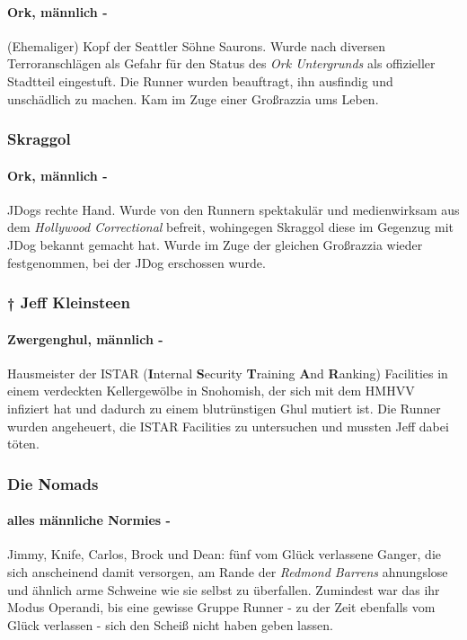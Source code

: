     \paragraph{Ork, männlich -} (Ehemaliger) Kopf der Seattler Söhne Saurons. Wurde nach diversen Terroranschlägen als Gefahr für den Status des \textit{Ork Untergrunds} als offizieller Stadtteil eingestuft. Die Runner wurden beauftragt, ihn ausfindig und unschädlich zu machen. Kam im Zuge einer Großrazzia ums Leben.
    
    \subsubsection{Skraggol}
    \paragraph{Ork, männlich -} JDogs rechte Hand. Wurde von den Runnern spektakulär und medienwirksam aus dem \textit{Hollywood Correctional} befreit, wohingegen Skraggol diese im Gegenzug mit JDog bekannt gemacht hat. Wurde im Zuge der gleichen Großrazzia wieder festgenommen, bei der JDog erschossen wurde.
    
    
    \subsubsection{\textsf{†} Jeff Kleinsteen}
    \paragraph{Zwergenghul, männlich -} Hausmeister der ISTAR (\textbf{I}nternal \textbf{S}ecurity \textbf{T}raining \textbf{A}nd \textbf{R}anking) Facilities in einem verdeckten Kellergewölbe in Snohomish, der sich mit dem HMHVV infiziert hat und dadurch zu einem blutrünstigen Ghul mutiert ist. Die Runner wurden angeheuert, die ISTAR Facilities zu untersuchen und mussten Jeff dabei töten.
    
    
    \subsubsection{Die Nomads}
    \paragraph{alles männliche Normies -} Jimmy, Knife, Carlos, Brock und Dean: fünf vom Glück verlassene Ganger, die sich anscheinend damit versorgen, am Rande der \textit{Redmond Barrens} ahnungslose und ähnlich arme Schweine wie sie selbst zu überfallen. Zumindest war das ihr Modus Operandi, bis eine gewisse Gruppe Runner - zu der Zeit ebenfalls vom Glück verlassen - sich den Scheiß nicht haben geben lassen.
    
